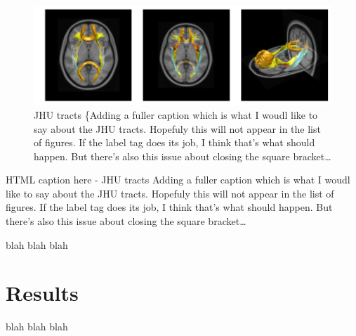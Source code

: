     \begin{figure}[htbp]
\centering
\includegraphics{figures/Ch2_JHU_tracts.png}
\caption{JHU tracts \{Adding a fuller caption which is what I woudl like
to say about the JHU tracts. Hopefuly this will not appear in the list
of figures. If the label tag does its job, I think that's what should
happen. But there's also this issue about closing the square
bracket\ldots{} \label{fig:JHU tracts}}
\end{figure}

HTML caption here - JHU tracts Adding a fuller caption which is what I
woudl like to say about the JHU tracts. Hopefuly this will not appear in
the list of figures. If the label tag does its job, I think that's what
should happen. But there's also this issue about closing the square
bracket\ldots{}

    blah blah blah


    \section{Results}


    blah blah blah


